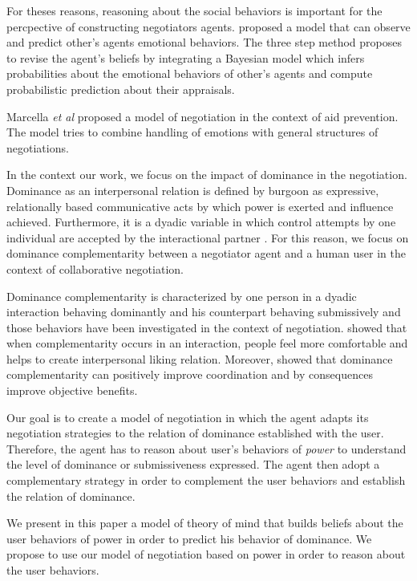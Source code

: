\documentclass[conference, letterpaper]{IEEEtran}
\begin{document}
For theses reasons, reasoning about the social behaviors is important for the percpective of constructing negotiators agents. \cite{alfonso2015emotional} proposed a model that can observe and predict other's agents emotional behaviors. The three step method proposes to revise the agent's  beliefs by integrating a Bayesian model which infers probabilities about the emotional behaviors of other's agents and compute probabilistic prediction about their appraisals.

Marcella \textit{et al} \cite{klatt2011negotiations} proposed a model of negotiation in the context of aid prevention. The model tries to combine handling of emotions with general structures of negotiations. 

In the context our work, we focus on the impact of dominance in the negotiation. Dominance as an interpersonal relation is defined by burgoon \cite{burgoon1998nature} as expressive, relationally based communicative acts by which power is exerted and influence achieved. Furthermore, it is a dyadic variable in which control attempts by one individual are accepted by the
interactional partner \cite{dunbar2005perceptions}. For this reason, we focus on dominance complementarity between a negotiator agent and a human user in the context of collaborative negotiation. 

Dominance complementarity is characterized by one person in a dyadic interaction behaving dominantly and his counterpart behaving submissively \cite{tiedens2003power} and those behaviors have been investigated in the context of negotiation. \cite{tiedens2003power} showed that when complementarity occurs in an interaction, people feel more comfortable and helps to create interpersonal liking relation.
Moreover, \cite{wiltermuth2015benefits} showed that dominance complementarity can positively improve coordination and by consequences improve objective benefits.

Our goal is to create a model of negotiation in which the agent adapts its negotiation strategies to the relation of dominance established with the user. Therefore, the agent has to reason about user's behaviors of \emph{power} to understand the level of dominance or submissiveness expressed. The agent then adopt a complementary strategy in order to complement the user behaviors and establish the relation of dominance.

We present in this paper a model of theory of mind that builds beliefs about the user behaviors of power in order to predict his behavior of dominance. We propose to use our model of negotiation based on power in order to reason about the user behaviors. 
\end{document}
